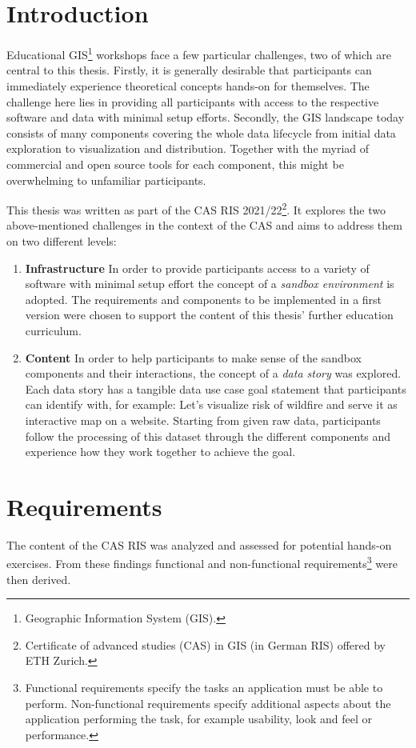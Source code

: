 \documentclass[11pt, a4paper, oneside, parskip=full-]{scrartcl}
\begin{document}
\section{Introduction}
Educational GIS\footnote{Geographic Information System (GIS).} workshops face a
few particular challenges, two of which are central to this thesis. Firstly, it
is generally desirable that participants can immediately experience theoretical
concepts hands-on for themselves. The challenge here lies in providing all
participants with access to the respective software and data with minimal setup
efforts. Secondly, the GIS landscape today consists of many components covering
the whole data lifecycle from initial data exploration to visualization and
distribution. Together with the myriad of commercial and open source tools for
each component, this might be overwhelming to unfamiliar participants.

This thesis was written as part of the CAS RIS 2021/22\footnote{Certificate of
advanced studies (CAS) in GIS (in German RIS) offered by ETH Zurich.}. It
explores the two above-mentioned challenges in the context of the CAS and aims
to address them on two different levels:
\begin{enumerate}
  \item \textbf{Infrastructure} In order to provide participants access to a
  variety of software with minimal setup effort the concept of a \emph{sandbox
  environment} is adopted. The requirements and components to be implemented in
  a first version were chosen to support the content of this thesis' further
  education curriculum.
  \item \textbf{Content} In order to help participants to make sense of the
  sandbox components and their interactions, the concept of a \emph{data story}
  was explored. Each data story has a tangible data use case goal statement that
  participants can identify with, for example: Let's visualize risk of wildfire
  and serve it as interactive map on a website. Starting from given raw data,
  participants follow the processing of this dataset through the different
  components and experience how they work together to achieve the goal.
\end{enumerate}


\section{Requirements} \label{sectionrequirements} The content of the CAS RIS
was analyzed and assessed for potential hands-on exercises. From these findings
functional and non-functional requirements\footnote{Functional requirements
specify the tasks an application must be able to perform. Non-functional
requirements specify additional aspects about the application performing the
task, for example usability, look and feel or performance. } were then derived.
\end{document}
